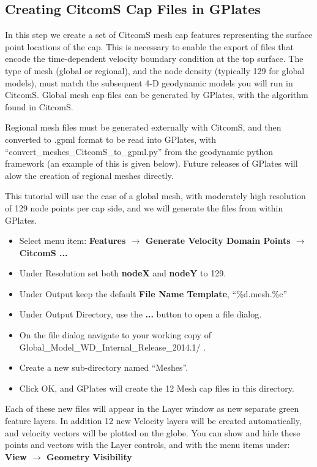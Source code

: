 \documentclass[letterpaper,12pt]{article}
\newcommand{\gp}[1]{\textbf{#1}}
\newcommand{\gplatesmodel}{Global\_Model\_WD\_Internal\_Release\_2014.1/ }
\begin{document}
\subsection{Creating CitcomS Cap Files in GPlates}

In this step we create a set of CitcomS mesh cap features representing the surface point locations of the cap.  This is necessary to enable the export of files that encode the time-dependent velocity boundary condition at the top surface.  The type of mesh (global or regional), and the node density (typically 129 for global models), must match the subsequent 4-D geodynamic models you will run in CitcomS.  Global mesh cap files can be generated by GPlates, with the algorithm found in CitcomS.  

Regional mesh files must be generated externally with CitcomS, and then converted to .gpml format to be read into GPlates, with ``convert\_meshes\_CitcomS\_to\_gpml.py'' from the geodynamic python framework (an example of this is given below).  Future releases of GPlates will alow the creation of regional meshes directly.  

This tutorial will use the case of a global mesh, with moderately high resolution of 129 node points per cap side, and we will generate the files from within GPlates.

\begin{itemize}
\item Select menu item: \gp{Features $\rightarrow$ Generate Velocity Domain Points $\rightarrow$ CitcomS ...}
\item Under Resolution set both \gp{nodeX} and \gp{nodeY} to 129.
\item Under Output keep the default \gp{File Name Template}, ``\%d.mesh.\%c''
\item Under Output Directory, use the \gp{...} button to open a file dialog.
\item On the file dialog navigate to your working copy of \gplatesmodel.
\item Create a new sub-directory named ``Meshes''.
\item Click OK, and GPlates will create the 12 Mesh cap files in this directory.
\end{itemize}

Each of these new files will appear in the Layer window as new separate green feature layers.
In addition 12 new Velocity layers will be created automatically, and velocity vectors will be plotted on the globe.
You can show and hide these points and vectors with the Layer controls, and with the menu items under:
\gp{View $\rightarrow$ Geometry Visibility}
\end{document}
